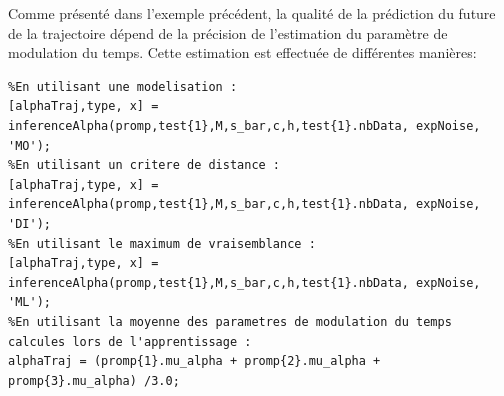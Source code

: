\documentclass[utf8]{frontiersSCNS} %
\newcommand{\todo}[1]{\textcolor{red}{\textbf{/*#1*/}}}
\begin{document}


Comme présenté dans l'exemple précédent, la qualité de la prédiction du future de la trajectoire dépend de la précision de l'estimation du paramètre de modulation du temps. Cette estimation est effectuée de différentes manières: 
\begin{lstlisting}
%En utilisant une modelisation :
[alphaTraj,type, x] = inferenceAlpha(promp,test{1},M,s_bar,c,h,test{1}.nbData, expNoise, 'MO');
%En utilisant un critere de distance :
[alphaTraj,type, x] = inferenceAlpha(promp,test{1},M,s_bar,c,h,test{1}.nbData, expNoise, 'DI');
%En utilisant le maximum de vraisemblance :
[alphaTraj,type, x] = inferenceAlpha(promp,test{1},M,s_bar,c,h,test{1}.nbData, expNoise, 'ML');
%En utilisant la moyenne des parametres de modulation du temps calcules lors de l'apprentissage :
alphaTraj = (promp{1}.mu_alpha + promp{2}.mu_alpha + promp{3}.mu_alpha) /3.0;  
\end{lstlisting}
\end{document}
